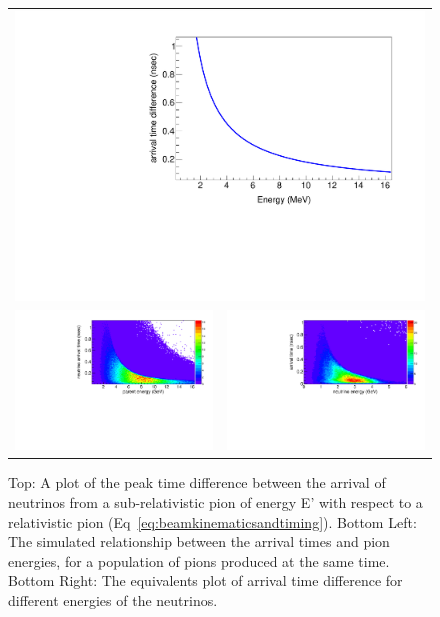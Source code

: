 \begin{figure}[h]
	\begin{center}
           	\begin{tabular}{c c}
 \multicolumn{2}{c}{\includegraphics[width=0.5\linewidth]{Figures/deltaTvsE.pdf}} \\
 \includegraphics[width=0.49\linewidth]{Figures/parentEvsdT.pdf} &
 \includegraphics[width=0.49\linewidth]{Figures/nuEvsdT.pdf} \\
			\end{tabular}
	\end{center}
	\caption{Top: A plot of the peak time difference between the arrival of neutrinos from a sub-relativistic pion of energy E' with respect to a relativistic pion (Eq~\ref{eq:beamkinematicsandtiming}). Bottom Left: The simulated relationship between the arrival times and pion energies, for a population of pions produced at the same time. Bottom Right: The equivalents plot of arrival time difference for different energies of the neutrinos.}
		\label{fig:beamkinematicsandtiming}
\end{figure}


